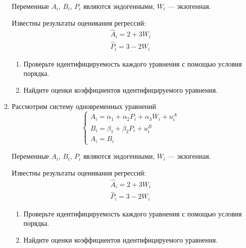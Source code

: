 \documentclass[12pt]{article}
\theoremstyle{definition}
\begin{document}
\begin{enumerate}
Переменные $A_i$, $B_i$, $P_i$ являются эндогенными, $W_i$ — экзогенная. 

Известны результаты оценивания регрессий:
  \begin{align*}
    \hat A_i = 2 + 3 W_i \\
    \hat P_i = 3 - 2 W_i  
  \end{align*}

\begin{enumerate}
  \item Проверьте идентифицируемость каждого уравнения с помощью условия порядка. 
  \item Найдите оценки коэффициентов идентифицируемого уравнения. 
\end{enumerate}

\item Рассмотрим систему одновременных уравнений
\[
\begin{cases}
A_i = \alpha_1 + \alpha_2 P_i + \alpha_3 W_i + u_i^A \\
B_i = \beta_1 + \beta_2 P_i + u_i^B \\
A_i = B_i
\end{cases}
\]

Переменные $A_i$, $B_i$, $P_i$ являются эндогенными, $W_i$ — экзогенная. 

Известны результаты оценивания регрессий:
  \begin{align*}
    \hat A_i = 2 + 3 W_i \\
    \hat P_i = 3 - 2 W_i     
  \end{align*}

\begin{enumerate}
  \item Проверьте идентифицируемость каждого уравнения с помощью условия порядка. 
  \item Найдите оценки коэффициентов идентифицируемого уравнения. 
\end{enumerate}




\end{enumerate}
\end{document}
